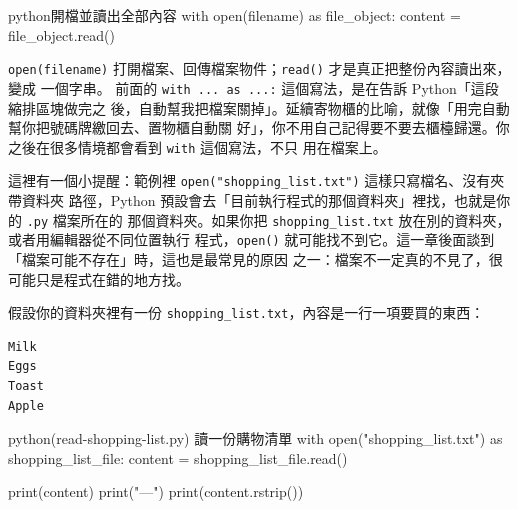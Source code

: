 \begin{code}{python}{開檔並讀出全部內容}
with open(filename) as file_object:
    content = file_object.read()
\end{code}

\texttt{open(filename)} 打開檔案、回傳檔案物件；\texttt{read()} 才是真正把整份內容讀出來，變成
一個字串。
前面的 \texttt{with ... as ...:} 這個寫法，是在告訴 Python「這段縮排區塊做完之
後，自動幫我把檔案關掉」。延續寄物櫃的比喻，就像「用完自動幫你把號碼牌繳回去、置物櫃自動關
好」，你不用自己記得要不要去櫃檯歸還。你之後在很多情境都會看到 \texttt{with} 這個寫法，不只
用在檔案上。


這裡有一個小提醒：範例裡 \texttt{open("shopping\_list.txt")} 這樣只寫檔名、沒有夾帶資料夾
路徑，Python 預設會去「目前執行程式的那個資料夾」裡找，也就是你的 \texttt{.py} 檔案所在的
那個資料夾。如果你把 \texttt{shopping\_list.txt} 放在別的資料夾，或者用編輯器從不同位置執行
程式，\texttt{open()} 就可能找不到它。這一章後面談到「檔案可能不存在」時，這也是最常見的原因
之一：檔案不一定真的不見了，很可能只是程式在錯的地方找。

假設你的資料夾裡有一份 \texttt{shopping\_list.txt}，內容是一行一項要買的東西：

\begin{verbatim}
Milk
Eggs
Toast
Apple
\end{verbatim}

\begin{example}{python}{(read-shopping-list.py) 讀一份購物清單}
with open("shopping_list.txt") as shopping_list_file:
    content = shopping_list_file.read()

print(content)
print("---")
print(content.rstrip())
\end{example}


